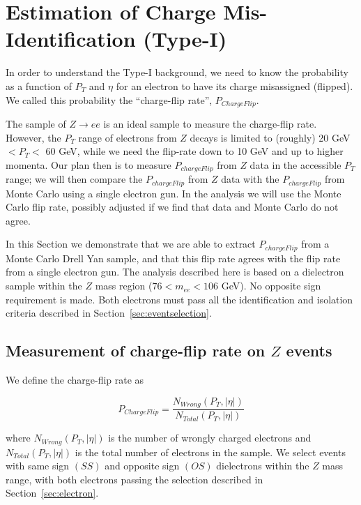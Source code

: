 \section{Estimation of Charge Mis-Identification (Type-I)}
\label{sec:chargemisid}

In order to understand the Type-I background, we need to know the 
probability as a function of $P_T$ and $\eta$ for an electron
to have its charge misassigned (flipped).  We called this 
probability the ``charge-flip rate'', $P_{ChargeFlip}$.


The sample of $Z \to ee$ is an ideal sample to measure the charge-flip rate.
However, the $P_T$ range of electrons from $Z$ decays is limited
to (roughly) 20 GeV $< P_T <$ 60 GeV, while we need the flip-rate
down to 10 GeV and up to higher momenta.
Our plan then is to measure $P_{chargeFlip}$ from $Z$ data in the 
accessible $P_T$ range;  we will then compare 
the $P_{chargeFlip}$ from $Z$ data with the $P_{chargeFlip}$ from 
Monte Carlo using a single electron gun.  In the analysis we will
use the Monte Carlo flip rate, possibly adjusted if we find that
data and Monte Carlo do not agree.


In this Section we demonstrate that we are able to extract 
$P_{chargeFlip}$ from a Monte Carlo Drell Yan sample, and that
this flip rate agrees with the flip rate from a 
single electron gun.  The analysis described here is based on 
a dielectron sample within the $Z$ mass region
($76 < m_{ee} < 106 $ GeV).   No opposite sign requirement is 
made.  Both electrons must pass all the identification and isolation
criteria described in Section~\ref{sec:eventselection}.



\subsection{Measurement of charge-flip rate on $Z$ events}

We define the charge-flip rate as

\begin{equation}
P_{ChargeFlip} = \frac{N_{Wrong}(P_T, |\eta|)}{N_{Total}(P_T, |\eta|)}
\end{equation}

where $N_{Wrong}(P_T, |\eta|)$ is the number of wrongly charged electrons  
and $N_{Total}(P_T, |\eta|)$ is 
the total number of electrons in the sample. We select events with same sign $(SS)$ 
and opposite sign $(OS)$ dielectrons within the $Z$ mass range, with both electrons passing the 
selection described in Section~\ref{sec:electron}.

